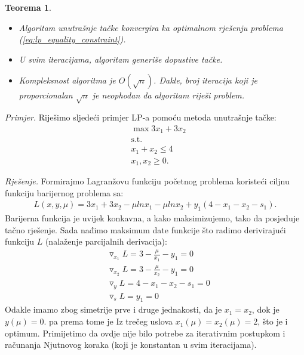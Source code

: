 \documentclass[a4paper, utf8, 11pt, colorlinks]{book}
\newtheorem{thm}{Teorema}
\begin{document}
\begin{thm}
	\begin{itemize}
		\item Algoritam unutrašnje tačke konvergira ka optimalnom rješenju problema (\ref{eq:lp_equality_constraint}). %
		\item U svim iteracijama, algoritam generiše dopustive tačke.
		\item Kompleksnost algoritma je $O(\sqrt{n})$. Dakle,  broj iteracija koji je proporcionalan $\sqrt{n}$ je neophodan da algoritam riješi problem. 
	\end{itemize}
\end{thm}
\emph{Primjer.} Riješimo sljedeći primjer LP-a pomoću metoda unutrašnje tačke:
\begin{align*}
	&\max 3 x_1 + 3 x_2 \\
	&\mbox{s.t.} \\
	& x_1 + x_2 \leq 4 \\
	& x_1, x_2 \geq 0.
\end{align*}

\emph{Rješenje.}  Formirajmo Lagranžovu funkciju početnog problema koristeći ciljnu funkciju barijernog problema sa:  
\begin{align*}
   L(x, y, \mu) = 	  3 x_1 + 3 x_2 -\mu ln x_1 - \mu ln x_2 + y_1(4- x_1 - x_2 - s_1).  
\end{align*}
Barijerna funkcija je uvijek konkavna, a kako maksimizujemo,  tako da posjeduje tačno rješenje.  Sada nađimo maksimum date funkcije što radimo derivirajući funkciju $L$ (nalaženje parcijalnih derivacija):
\begin{align*}
	 &\triangledown_{x_1} L   =  3 - \frac{\mu}{x_1}  - y_1 = 0 \\
	 &\triangledown_{x_2} L   =  3 - \frac{\mu}{x_2} - y_1 = 0 \\
	 &\triangledown_{y} L   = {4-x_1-x_2 - s_1} = 0 \\
	 &\triangledown_{s} L   = { y_1} = 0 
\end{align*}
Odakle imamo zbog simetrije prve i druge jednakosti, da je  $x_1 = x_2$, dok je $y(\mu) = 0$. pa prema tome je 
Iz trečeg uslova   $x_1(\mu)=x_2(\mu)=2$, što je i optimum. Primijetimo da ovdje nije bilo potrebe za iterativnim postupkom i računanja Njutnovog koraka (koji je konstantan u svim iteracijama). 
\end{document}
